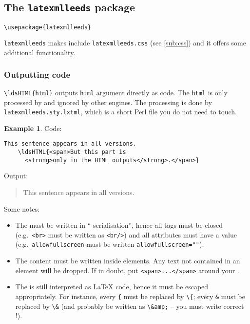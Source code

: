 \documentclass[a4paper]{article}
\def\ltxinline{\lstinline[style=latexml]}
\theoremstyle{definition}
\newtheorem{exa}{Example}[subsection]
\begin{document}
\subsection{The \texttt{latexmlleeds} package}
\label{sub:latexmlleeds-sty}
\begin{lstlisting}[style=latexml,caption={Import \texttt{latexmlleeds} in the preamble}]
  \usepackage{latexmlleeds}
\end{lstlisting}

\verb|latexmlleeds| makes \LaTeXML{} include \verb|latexmlleeds.css| (see \autoref{sub:css}) and it offers some additional functionality.

\subsubsection{Outputting \HTML{} code}
\ltxinline|\ldsHTML{html}| outputs \ltxinline|html| argument directly as \HTML{} code. The \ltxinline|html| is only processed by \LaTeXML{} and ignored by other engines. The \LaTeXML{} processing is done by \verb|latexmlleeds.sty.lxtml|, which is a short Perl file you do not need to touch.
\begin{exa}
  Code:
  \begin{lstlisting}[style=latexml]
    This sentence appears in all versions.
    \ldsHTML{<span>But this part is
      <strong>only in the HTML outputs</strong>.</span>}
  \end{lstlisting}
  Output:
  \begin{quote}
    This sentence appears in all versions.
  \end{quote}
\end{exa}

Some notes:
\begin{itemize}
  \item The \HTML{} must be written in ``\XML{} serialisation'', hence all tags must be closed (e.g.\ \verb|<br>| must be written as \verb|<br/>|) and all attributes must have a value (e.g.\ \verb|allowfullscreen| must be written \verb|allowfullscreen=""|).
  \item The content must be written inside \HTML{} elements. Any text not contained in an element will be dropped. If in doubt, put \verb|<span>...</span>| around your \HTML{}.
  \item The \HTML{} is still interpreted as \LaTeX{} code, hence it must be escaped appropriately. For instance, every \ltxinline|{| must be replaced by \ltxinline|\{|; every \ltxinline|&| must be replaced by \ltxinline|\&| (and probably be written as \ltxinline|\&amp;| -- you must write correct \HTML{}!).
\end{itemize}
\end{document}
